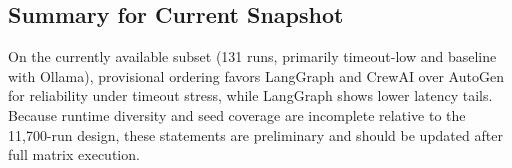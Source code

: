 \subsection{Summary for Current Snapshot}

On the currently available subset (131 runs, primarily timeout-low and baseline with Ollama), provisional ordering favors LangGraph and CrewAI over AutoGen for reliability under timeout stress, while LangGraph shows lower latency tails. Because runtime diversity and seed coverage are incomplete relative to the 11,700-run design, these statements are preliminary and should be updated after full matrix execution.
